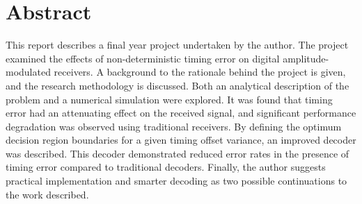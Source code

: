 

\begingroup
\let\clearpage\relax
\let\cleardoublepage\relax
\let\cleardoublepage\relax

\chapter*{Abstract} %

This report describes a final year project undertaken by the author. The project examined the effects of non-deterministic timing error on digital amplitude-modulated receivers. A background to the rationale behind the project is given, and the research methodology is discussed. Both an analytical description of the problem and a numerical simulation were explored. It was found that timing error had an attenuating effect on the received signal, and significant performance degradation was observed using traditional receivers. By defining the optimum decision region boundaries for a given timing offset variance, an improved decoder was described. This decoder demonstrated reduced error rates in the presence of timing error compared to traditional decoders. Finally, the author suggests practical implementation and smarter decoding as two possible continuations to the work described.

\endgroup			

\vfill